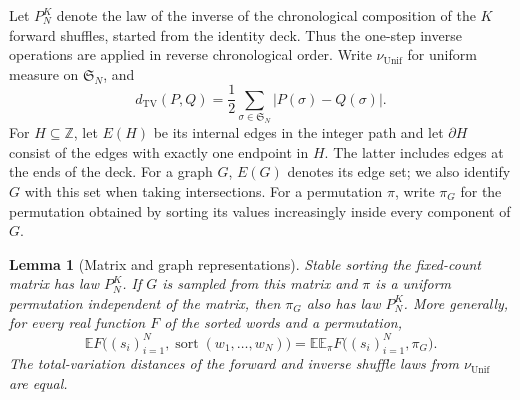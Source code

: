\documentclass[11pt]{article}
\numberwithin{equation}{section}
\newtheorem{lemma}[theorem]{Lemma}
\theoremstyle{definition}
\theoremstyle{remark}
\newcommand{\E}{\mathbb E}
\newcommand{\TV}{\mathrm{TV}}
\newcommand{\Unif}{\mathrm{Unif}}
\newcommand{\dTV}{d_{\TV}}
\newcommand{\nuUnif}{\nu_{\Unif}}
\newcommand{\1}{\mathbf 1}
\begin{document}
Let $P_N^K$ denote the law of the inverse of the chronological
composition of the $K$ forward shuffles, started from the identity
deck. Thus the one-step inverse operations are applied in reverse
chronological order. Write $\nuUnif$ for uniform measure on
$\mathfrak S_N$, and
\[
 \dTV(P,Q)=\frac12\sum_{\sigma\in\mathfrak S_N}|P(\sigma)-Q(\sigma)|.
\]
For $H\subseteq\mathbb Z$, let $E(H)$ be its internal edges in the
integer path and let $\partial H$ consist of the edges with exactly
one endpoint in $H$. The latter includes edges at the ends of the
deck. For a graph $G$, $E(G)$ denotes its edge set; we also identify
$G$ with this set when taking intersections. For a permutation $\pi$,
write $\pi_G$ for the permutation obtained by sorting its values
increasingly inside every component of $G$.

\begin{lemma}[Matrix and graph representations]%
\label{lem:matrix-graph}
Stable sorting the fixed-count matrix has law $P_N^K$. If $G$ is
sampled from this matrix and $\pi$ is a uniform permutation independent
of the matrix, then $\pi_G$ also has law $P_N^K$. More generally,
for every real function $F$ of the sorted words and a permutation,
\[
 \E F\bigl((s_i)_{i=1}^N,\operatorname{sort}(w_1,\ldots,w_N)\bigr)
 =\E\E_\pi F\bigl((s_i)_{i=1}^N,\pi_G\bigr).
\]
The total-variation distances of the forward and inverse shuffle
laws from $\nuUnif$ are equal.
\end{lemma}
\end{document}
